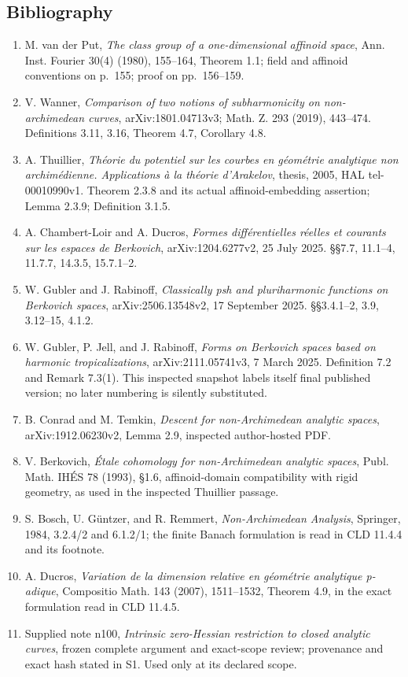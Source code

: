 \documentclass[
  11pt,
]{article}
\providecommand{\tightlist}{%
  \setlength{\itemsep}{0pt}\setlength{\parskip}{0pt}}
\begin{document}
\subsection{Bibliography}\label{bibliography}

\begin{enumerate}
\def\labelenumi{\arabic{enumi}.}
\tightlist
\item
  M. van der Put, \emph{The class group of a one-dimensional affinoid
  space}, Ann. Inst. Fourier 30(4) (1980), 155--164, Theorem 1.1; field
  and affinoid conventions on p.~155; proof on pp.~156--159.
\item
  V. Wanner, \emph{Comparison of two notions of subharmonicity on
  non-archimedean curves}, arXiv:1801.04713v3; Math. Z. 293 (2019),
  443--474. Definitions 3.11, 3.16, Theorem 4.7, Corollary 4.8.
\item
  A. Thuillier, \emph{Théorie du potentiel sur les courbes en géométrie
  analytique non archimédienne. Applications à la théorie d'Arakelov},
  thesis, 2005, HAL tel-00010990v1. Theorem 2.3.8 and its actual
  affinoid-embedding assertion; Lemma 2.3.9; Definition 3.1.5.
\item
  A. Chambert-Loir and A. Ducros, \emph{Formes différentielles réelles
  et courants sur les espaces de Berkovich}, arXiv:1204.6277v2, 25 July
  2025. §§7.7, 11.1--4, 11.7.7, 14.3.5, 15.7.1--2.
\item
  W. Gubler and J. Rabinoff, \emph{Classically psh and pluriharmonic
  functions on Berkovich spaces}, arXiv:2506.13548v2, 17 September 2025.
  §§3.4.1--2, 3.9, 3.12--15, 4.1.2.
\item
  W. Gubler, P. Jell, and J. Rabinoff, \emph{Forms on Berkovich spaces
  based on harmonic tropicalizations}, arXiv:2111.05741v3, 7 March 2025.
  Definition 7.2 and Remark 7.3(1). This inspected snapshot labels
  itself final published version; no later numbering is silently
  substituted.
\item
  B. Conrad and M. Temkin, \emph{Descent for non-Archimedean analytic
  spaces}, arXiv:1912.06230v2, Lemma 2.9, inspected author-hosted PDF.
\item
  V. Berkovich, \emph{Étale cohomology for non-Archimedean analytic
  spaces}, Publ. Math. IHÉS 78 (1993), §1.6, affinoid-domain
  compatibility with rigid geometry, as used in the inspected Thuillier
  passage.
\item
  S. Bosch, U. Güntzer, and R. Remmert, \emph{Non-Archimedean Analysis},
  Springer, 1984, 3.2.4/2 and 6.1.2/1; the finite Banach formulation is
  read in CLD 11.4.4 and its footnote.
\item
  A. Ducros, \emph{Variation de la dimension relative en géométrie
  analytique p-adique}, Compositio Math. 143 (2007), 1511--1532, Theorem
  4.9, in the exact formulation read in CLD 11.4.5.
\item
  Supplied note n100, \emph{Intrinsic zero-Hessian restriction to closed
  analytic curves}, frozen complete argument and exact-scope review;
  provenance and exact hash stated in S1. Used only at its declared
  scope.
\end{enumerate}
\end{document}

